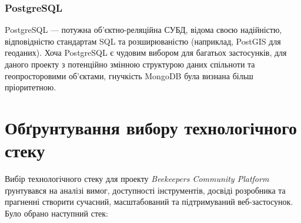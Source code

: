 \subsubsection{PostgreSQL}
PostgreSQL — потужна об'єктно-реляційна СУБД, відома своєю надійністю, відповідністю стандартам SQL та розширюваністю (наприклад, PostGIS для геоданих). Хоча PostgreSQL є чудовим вибором для багатьох застосунків, для даного проекту з потенційно змінною структурою даних спільноти та геопросторовими об'єктами, гнучкість MongoDB була визнана більш пріоритетною.

\section{Обґрунтування вибору технологічного стеку}
\label{sec:tech_justification}
Вибір технологічного стеку для проекту \textit{Beekeepers Community Platform} ґрунтувався на аналізі вимог, доступності інструментів, досвіді розробника та прагненні створити сучасний, масштабований та підтримуваний веб-застосунок. Було обрано наступний стек:
